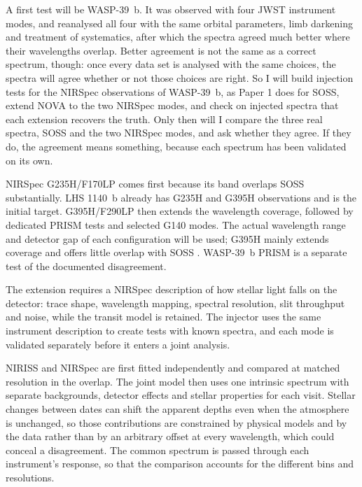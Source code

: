 A first test will be WASP-39~b. It was observed with four JWST instrument
modes, and \citet{CarterEtAl2024} reanalysed all four with the same
orbital parameters, limb darkening and treatment of systematics, after
which the spectra agreed much better where their wavelengths overlap.
Better agreement is not the same as a correct spectrum, though: once
every data set is analysed with the same choices, the spectra will agree
whether or not those choices are right. So I will build injection tests
for the NIRSpec observations of WASP-39~b, as Paper 1 does for SOSS,
extend NOVA to the two NIRSpec modes, and check on injected spectra that
each extension recovers the truth. Only then will I compare the three
real spectra, SOSS and the two NIRSpec modes, and ask whether they agree.
If they do, the agreement means something, because each spectrum has
been validated on its own.

NIRSpec G235H/F170LP comes first because its band overlaps SOSS
substantially. LHS 1140~b already has G235H and G395H observations
\citep{DamianoEtAl2024} and is the initial target. G395H/F290LP then
extends the wavelength coverage, followed by dedicated PRISM tests and
selected G140 modes. The actual wavelength range and detector gap of each
configuration will be used; G395H mainly extends coverage and offers
little overlap with SOSS \citep{JDoxNIRSpecBOTS2026}. WASP-39~b PRISM is a
separate test of the documented disagreement.

The extension requires a NIRSpec description of how stellar light falls
on the detector: trace shape, wavelength mapping, spectral resolution,
slit throughput and noise, while the transit model is retained. The
injector uses the same instrument description to create tests with known
spectra, and each mode is validated separately before it enters a joint
analysis.

NIRISS and NIRSpec are first fitted independently and compared at matched
resolution in the overlap. The joint model then uses one intrinsic
spectrum with separate backgrounds, detector effects and stellar
properties for each visit. Stellar changes between dates can shift the
apparent depths even when the atmosphere is unchanged, so those
contributions are constrained by physical models and by the data rather
than by an arbitrary offset at every wavelength, which could conceal a
disagreement. The common spectrum is passed through each instrument's
response, so that the comparison accounts for the different bins and
resolutions.

